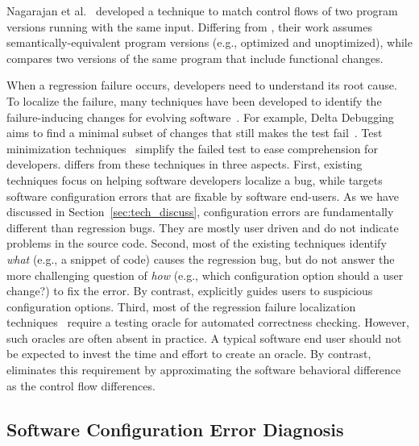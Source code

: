 Nagarajan et al.~\cite{4362621} developed a technique to match
control flows of two program versions running with
the same input. Differing from \ourtool, their
work assumes semantically-equivalent program versions (e.g., optimized
and unoptimized), while \ourtool compares two versions
of the same program that include functional changes. 

When a regression failure occurs, developers need
to understand its root cause. To localize the
failure, many techniques have been developed to identify the
failure-inducing changes for evolving
software~\cite{Banerjee:2010:GID, r2fix, Qi:2009:DAD, Hoffman:2009:STA}.
For example, Delta Debugging aims to find a minimal
subset of changes that still makes the test fail~\cite{dd}.
Test minimization techniques~\cite{Hoffman:2009:STA, Zhang:2013:PST}
simplify the failed
test to ease comprehension for developers. 
\ourtool differs from these techniques in three aspects.
First, existing techniques focus on helping software developers
localize a bug, while \ourtool targets software
configuration errors that are fixable by software end-users.
As we have discussed in Section~\ref{sec:tech_discuss},
configuration errors are fundamentally different than regression bugs.
They are mostly user driven and do not indicate problems in the source
code. Second, most of the existing techniques identify
\textit{what} (e.g., a snippet of code) causes the
regression bug, but do not answer
the more challenging question of \textit{how} (e.g., which
configuration option should a user change?) to
fix the error. By contrast, \ourtool
explicitly guides users to suspicious configuration options.
Third, most of the regression failure localization
techniques~\cite{dd} require 
a testing oracle for automated correctness checking. However,
such oracles are often absent in practice. A typical
software end user should not be expected to invest
the time and effort to create an oracle.
By contrast, \ourtool eliminates this requirement by
approximating the software behavioral difference as the control
flow differences.


\subsection{Software Configuration Error Diagnosis}

